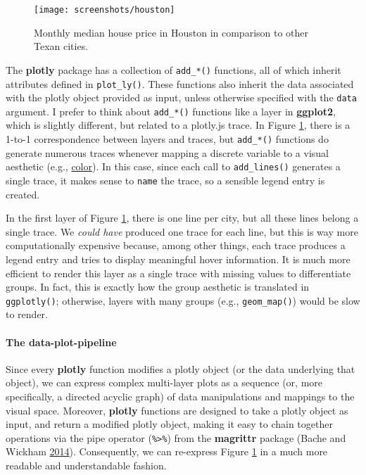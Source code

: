 \documentclass[12pt,]{isuthesis}
\let\oldparagraph\paragraph
\renewcommand{\paragraph}[1]{\oldparagraph{#1}\mbox{}}
\begin{document}
\begin{figure}
\centering
\texttt{[image: screenshots/houston]}
\caption{\label{fig:houston}Monthly median house price in Houston in
comparison to other Texan cities.}
\end{figure}

The \textbf{plotly} package has a collection of \texttt{add\_*()}
functions, all of which inherit attributes defined in
\texttt{plot\_ly()}. These functions also inherit the data associated
with the plotly object provided as input, unless otherwise specified
with the \texttt{data} argument. I prefer to think about
\texttt{add\_*()} functions like a layer in \textbf{ggplot2}, which is
slightly different, but related to a plotly.js trace. In Figure
\ref{fig:houston}, there is a 1-to-1 correspondence between layers and
traces, but \texttt{add\_*()} functions do generate numerous traces
whenever mapping a discrete variable to a visual aesthetic (e.g.,
\href{scatterplots-discrete-color}{color}). In this case, since each
call to \texttt{add\_lines()} generates a single trace, it makes sense
to \texttt{name} the trace, so a sensible legend entry is created.

In the first layer of Figure \ref{fig:houston}, there is one line per
city, but all these lines belong a single trace. We \emph{could have}
produced one trace for each line, but this is way more computationally
expensive because, among other things, each trace produces a legend
entry and tries to display meaningful hover information. It is much more
efficient to render this layer as a single trace with missing values to
differentiate groups. In fact, this is exactly how the group aesthetic
is translated in \texttt{ggplotly()}; otherwise, layers with many groups
(e.g., \texttt{geom\_map()}) would be slow to render.

\hypertarget{the-data-plot-pipeline}{\paragraph{The
data-plot-pipeline}\label{the-data-plot-pipeline}}

Since every \textbf{plotly} function modifies a plotly object (or the
data underlying that object), we can express complex multi-layer plots
as a sequence (or, more specifically, a directed acyclic graph) of data
manipulations and mappings to the visual space. Moreover,
\textbf{plotly} functions are designed to take a plotly object as input,
and return a modified plotly object, making it easy to chain together
operations via the pipe operator (\texttt{\%\textgreater{}\%}) from the
\textbf{magrittr} package (Bache and Wickham
\protect\hyperlink{ref-magrittr}{2014}). Consequently, we can re-express
Figure \ref{fig:houston} in a much more readable and understandable
fashion.
\end{document}
